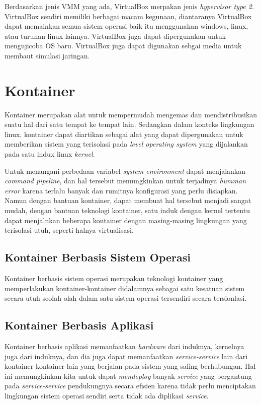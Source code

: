 Berdasarkan jenis VMM yang ada, VirtualBox merpakan jenis \textit{hypervisor type 2}. VirtualBox sendiri memiliki berbagai macam kegunaan, diantaranya VirtualBox dapat memainkan semua sistem  operasi baik itu menggunakan windows, linux, atau turunan linux lainnya. VirtualBox juga dapat dipergunakan untuk mengujicoba OS baru. VirtualBox juga dapat digunakan sebgai media untuk membaut simulasi jaringan.

\section{Kontainer}
Kontainer merupakan alat untuk mempermudah mengemas dan mendistribusikan suatu hal dari satu tempat ke tempat lain. Sedangkan dalam konteks lingkungan linux, kontainer dapat diartikan sebagai alat yang dapat dipergunakan untuk memberikan sistem yang terisolasi pada \textit{level operating system} yang dijalankan pada satu indux linux \textit{kernel}. \cite{bab2-kontainer}

Untuk menangani perbedaan variabel \textit{system environment} dapat menjalankan \textit{command pipeline}, dan hal tersebut memungkinkan untuk terjadinya \textit{humman error} karena terlalu banyak dan rumitnya konfigurasi yang perlu disiapkan. Namun dengan bantuan kontainer, dapat membuat hal tersebut menjadi sangat mudah, dengan bantuan teknologi kontainer, satu induk dengan kernel tertentu dapat menjalnkan beberapa kontainer dengan masing-masing lingkungan yang terisolasi utuh, seperti halnya virtualisasi.

\subsection{Kontainer Berbasis Sistem Operasi}
Kontainer berbasis sistem operasi merupakan teknologi kontainer yang memperlakukan kontainer-kontainer didalamnya sebagai satu kesatuan sistem secara utuh seolah-olah dalam satu sistem operasi tersendiri secara tersionlasi.

\subsection{Kontainer Berbasis Aplikasi}
Kontainer berbasis aplikasi memanfaatkan \textit{hardware} dari induknya, kernelnya juga dari induknya, dan dia juga dapat memanfaatkan \textit{service-service} lain dari kontainer-kontainer lain yang berjalan pada sistem yang saling berhubungan. Hal ini memungkinkan kita untuk dapat \textit{mendeploy} banyak \textit{service} yang bergantung pada \textit{service-service} pendukungnya secara efisien karena tidak perlu menciptakan lingkungan sistem operasi sendiri serta tidak ada diplikasi \textit{service}.

